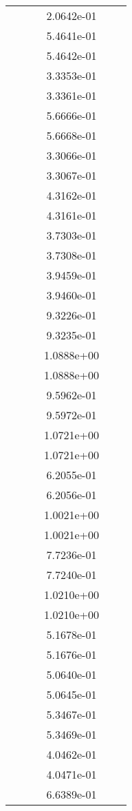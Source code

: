 \begin{xltabular}{\textwidth}{r|rS[table-format=1.3e+2]S[table-format=1.4e+2]S[table-format=1.4e+2]S[table-format=-1.5]}
&  &  & 2.0642e-01 & & \\
&  &  & 5.4641e-01 & & \\
&  &  & 5.4642e-01 & & \\
&  &  & 3.3353e-01 & & \\
&  &  & 3.3361e-01 & & \\
&  &  & 5.6666e-01 & & \\
&  &  & 5.6668e-01 & & \\
&  &  & 3.3066e-01 & & \\
&  &  & 3.3067e-01 & & \\
&  &  & 4.3162e-01 & & \\
&  &  & 4.3161e-01 & & \\
&  &  & 3.7303e-01 & & \\
&  &  & 3.7308e-01 & & \\
&  &  & 3.9459e-01 & & \\
&  &  & 3.9460e-01 & & \\
&  &  & 9.3226e-01 & & \\
&  &  & 9.3235e-01 & & \\
&  &  & 1.0888e+00 & & \\
&  &  & 1.0888e+00 & & \\
&  &  & 9.5962e-01 & & \\
&  &  & 9.5972e-01 & & \\
&  &  & 1.0721e+00 & & \\
&  &  & 1.0721e+00 & & \\
&  &  & 6.2055e-01 & & \\
&  &  & 6.2056e-01 & & \\
&  &  & 1.0021e+00 & & \\
&  &  & 1.0021e+00 & & \\
&  &  & 7.7236e-01 & & \\
&  &  & 7.7240e-01 & & \\
&  &  & 1.0210e+00 & & \\
&  &  & 1.0210e+00 & & \\
&  &  & 5.1678e-01 & & \\
&  &  & 5.1676e-01 & & \\
&  &  & 5.0640e-01 & & \\
&  &  & 5.0645e-01 & & \\
&  &  & 5.3467e-01 & & \\
&  &  & 5.3469e-01 & & \\
&  &  & 4.0462e-01 & & \\
&  &  & 4.0471e-01 & & \\
&  &  & 6.6389e-01 & & \\

\end{xltabular}
